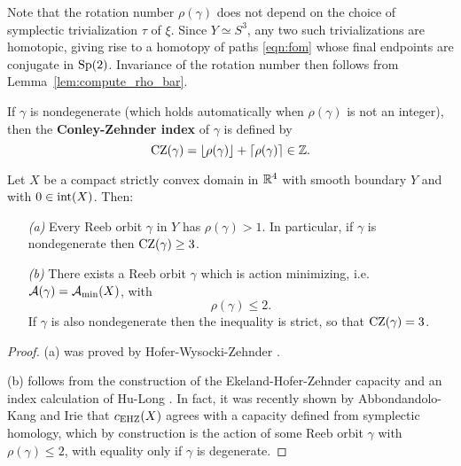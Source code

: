 Note that the rotation number $\rho(\gamma)$ does not depend on the choice of symplectic trivialization $\tau$ of $\xi$. Since $Y\simeq S^3$, any two such trivializations are homotopic, giving rise to a homotopy of paths \eqref{eqn:fom} whose final endpoints are conjugate in $\operatorname{Sp}(2)$. Invariance of the rotation number then follows from Lemma~\ref{lem:compute_rho_bar}.

If $\gamma$ is nondegenerate (which holds automatically when $\rho(\gamma)$ is not an integer), then the {\bf Conley-Zehnder index\/} of $\gamma$ is defined by
\begin{equation}
\label{eqn:CZrot}
\operatorname{CZ}(\gamma) = \left\lfloor \rho(\gamma) \right\rfloor + \left\lceil \rho(\gamma) \right\rceil \in {\mathbb Z}.
\end{equation}

\begin{proposition}
\label{prop:ehwz}
Let $X$ be a compact strictly convex domain in ${\mathbb R}^4$ with smooth boundary $Y$ and with $0\in\operatorname{int}(X)$. Then:
\begin{itemize}
\item[\emph{(a)}] 
Every Reeb orbit $\gamma$ in $Y$ has $\rho(\gamma)>1$. In particular, if $\gamma$ is nondegenerate then $\operatorname{CZ}(\gamma)\ge 3$.
\item[\emph{(b)}] 
There exists a Reeb orbit $\gamma$ which is action minimizing, i.e.\ ${\mathcal A}(\gamma) = {\mathcal A}_{\operatorname{min}}(X)$, with
\[
\rho(\gamma) \le 2.
\]
If $\gamma$ is also nondegenerate then the inequality is strict, so that $\operatorname{CZ}(\gamma)=3$.
\end{itemize}
\end{proposition}

\begin{proof}
(a) was proved by Hofer-Wysocki-Zehnder \cite{hwz}.

(b) follows from the construction of the Ekeland-Hofer-Zehnder capacity and an index calculation of Hu-Long \cite{hulong2002}. In fact, it was recently shown by Abbondandolo-Kang \cite{ak} and Irie \cite{irie} that $c_{\operatorname{EHZ}}(X)$ agrees with a capacity defined from symplectic homology, which by construction is the action of some Reeb orbit $\gamma$ with $\rho(\gamma)\le 2$, with equality only if $\gamma$ is degenerate.
\end{proof}

